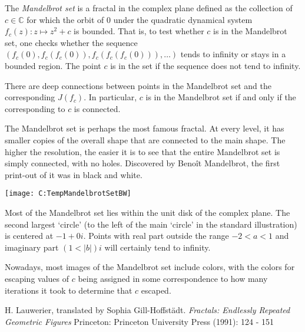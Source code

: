 \documentclass[12pt]{article}
\begin{document}
The \emph{Mandelbrot set} is a fractal in the complex plane defined as the collection of $c\in\mathbb{C}$ for which the orbit of $0$ under the quadratic dynamical system $f_c(z)\colon z \mapsto z^2 + c$ is bounded. That is, to test whether $c$ is in the Mandelbrot set, one checks whether the sequence $(f_c(0), f_c(f_c(0)), f_c(f_c(f_c(0))), \ldots)$ tends to infinity or stays in a bounded region. The point $c$ is in the set if the sequence does not tend to infinity.
 
There are deep connections between points in the Mandelbrot set and the corresponding  $J(f_c)$.  In particular, $c$ is in the Mandelbrot set if and only if the  corresponding to $c$ is connected.

The Mandelbrot set is perhaps the most famous fractal. At every level, it has smaller copies of the overall shape that are connected to the main shape. The higher the resolution, the easier it is to see that the entire Mandelbrot set is simply connected, with no holes. Discovered by Beno\^it Mandelbrot, the first print-out of it was in black and white.

\begin{center}
\texttt{[image: C:TempMandelbrotSetBW]}
\end{center}

Most of the Mandelbrot set lies within the unit disk of the complex plane. The second largest `circle' (to the left of the main `circle' in the standard illustration) is centered at $-1 + 0i$. Points with real part outside the range $-2 < a < 1$ and imaginary part $(1 < |b|)i$ will certainly tend to infinity.

Nowadays, most images of the Mandelbrot set include colors, with the colors for escaping values of $c$ being assigned in some correspondence to how many iterations it took to determine that $c$ escaped.

\begin{thebibliography}{1}
 H. Lauwerier, translated by Sophia Gill-Hoffst\"adt. {\it Fractals: Endlessly Repeated Geometric Figures} Princeton: Princeton University Press (1991): 124 - 151
\end{thebibliography}
\end{document}
